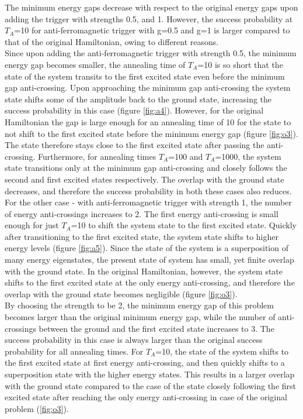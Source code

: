 \documentclass[../main.tex]{subfiles}
\begin{document}
The minimum energy gaps decrease with respect to the original energy gaps upon adding the trigger with strengths 0.5, and 1. However, the success probability at $T_A$=10 for anti-ferromagnetic trigger with g=0.5 and g=1 is larger compared to that of the original Hamiltonian, owing to different reasons.\\

Since upon adding the anti-ferromagnetic trigger with strength 0.5, the minimum energy gap becomes smaller, the annealing time of $T_A$=10 is so short that the state of the system transits to the first excited state even before the minimum gap anti-crossing. Upon approaching the minimum gap anti-crossing the system state shifts some of the amplitude back to the ground state, increasing the success probability in this case (figure \ref{fig:a4}). However, for the original Hamiltonian the gap is large enough for an annealing time of 10 for the state to not shift to the first excited state before the minimum energy gap (figure \ref{fig:o3}). The state therefore stays close to the first excited state after passing the anti-crossing.
Furthermore, for annealing times $T_A$=100 and $T_A$=1000, the system state transitions only at the minimum gap anti-crossing and closely follows the second and first excited states respectively. The overlap with the ground state decreases, and therefore the success probability in both these cases also reduces.\\

For the other case - with anti-ferromagnetic trigger with strength 1, the number of energy anti-crossings increases to 2. The first energy anti-crossing is small enough for just $T_A$=10 to shift the system state to the first excited state. Quickly after transitioning to the first excited state, the system state shifts to higher energy levels (figure \ref{fig:a5}). Since the state of the system is a superposition of many energy eigenstates, the present state of system has small, yet finite overlap with the ground state. In the original Hamiltonian, however, the system state shifts to the first excited state at the only energy anti-crossing, and therefore the overlap with the ground state becomes negligible (figure \ref{fig:o3}).\\

By choosing the strength to be 2, the minimum energy gap of this problem becomes larger than the original minimum energy gap, while the number of anti-crossings between the ground and the first excited state increases to 3. The success probability in this case is always larger than the original success probability for all annealing times. For $T_A$=10, the state of the system shifts to the first excited state at first energy anti-crossing, and then quickly shifts to a superposition state with the higher energy states. This results in a larger overlap with the ground state compared to the case of the state closely following the first excited state after reaching the only energy anti-crossing in case of the original problem (\ref{fig:o3}).
\end{document}
